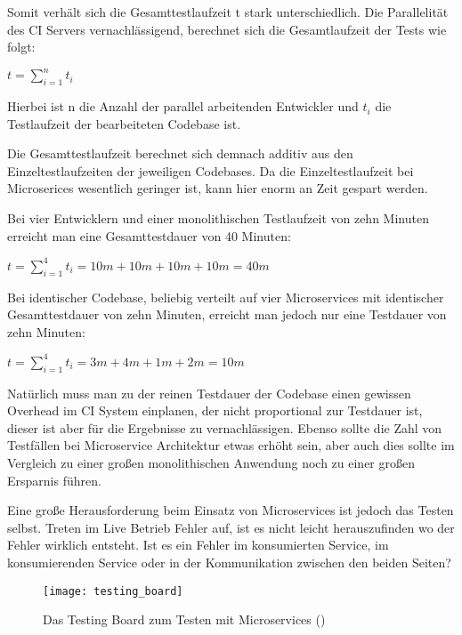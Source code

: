 Somit verhält sich die Gesamttestlaufzeit t stark unterschiedlich. Die Parallelität des CI Servers vernachlässigend, berechnet sich die Gesamtlaufzeit der Tests wie folgt:

\begin{center}
$ t = \displaystyle\sum_{i=1}^{n} t_i $
\end{center}

\noindent Hierbei ist n die Anzahl der parallel arbeitenden Entwickler und $t_i$ die Testlaufzeit der bearbeiteten Codebase ist.

Die Gesamttestlaufzeit berechnet sich demnach additiv aus den Einzeltestlaufzeiten der jeweiligen Codebases. Da die Einzeltestlaufzeit bei Microserices wesentlich geringer ist, kann hier enorm an Zeit gespart werden.

Bei vier Entwicklern und einer monolithischen Testlaufzeit von zehn Minuten erreicht man eine Gesamttestdauer von 40 Minuten:

\begin{center}
$ t = \displaystyle\sum_{i=1}^{4} t_i = 10m + 10m + 10m + 10m = 40m $
\end{center}

\noindent Bei identischer Codebase, beliebig verteilt auf vier Microservices mit identischer Gesamttestdauer von zehn Minuten, erreicht man jedoch nur eine Testdauer von zehn Minuten:

\begin{center}
$ t = \displaystyle\sum_{i=1}^{4} t_i = 3m + 4m + 1m + 2m = 10m $
\end{center}

\noindent Natürlich muss man zu der reinen Testdauer der Codebase einen gewissen Overhead im CI System einplanen, der nicht proportional zur Testdauer ist, dieser ist aber für die Ergebnisse zu vernachlässigen. Ebenso sollte die Zahl von Testfällen bei Microservice Architektur etwas erhöht sein, aber auch dies sollte im Vergleich zu einer großen monolithischen Anwendung noch zu einer großen Ersparnis führen.

Eine große Herausforderung beim Einsatz von Microservices ist jedoch das Testen selbst. Treten im Live Betrieb Fehler auf, ist es nicht leicht herauszufinden wo der Fehler wirklich entsteht. Ist es ein Fehler im konsumierten Service, im konsumierenden Service oder in der Kommunikation zwischen den beiden Seiten?

\begin{wrapfigure}{l}{0.5\textwidth}
    \caption{Das Testing Board zum Testen mit Microservices (\cite{rails:soa})}
    \label{fig:testboard}
    \texttt{[image: testing\_board]}
\end{wrapfigure}

